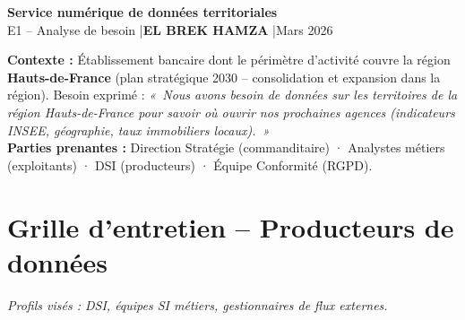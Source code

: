 \documentclass[11pt,a4paper]{article}
\begin{document}

\begin{center}
  {\large \textbf{Service numérique de données territoriales}}\\[0.2cm]
  {\normalsize E1 -- Analyse de besoin \quad|\quad \textbf{EL BREK HAMZA} \quad|\quad Mars 2026}
\end{center}

\vspace{0.2cm}
\begin{tcolorbox}[info]
\textbf{Contexte :} Établissement bancaire dont le périmètre d'activité couvre la région \textbf{Hauts-de-France} (plan stratégique 2030 -- consolidation et expansion dans la région). Besoin exprimé : \textit{«~Nous avons besoin de données sur les territoires de la région Hauts-de-France pour savoir où ouvrir nos prochaines agences (indicateurs INSEE, géographie, taux immobiliers locaux).~»}\\
\textbf{Parties prenantes :} Direction Stratégie (commanditaire) · Analystes métiers (exploitants) · DSI (producteurs) · Équipe Conformité (RGPD).
\end{tcolorbox}

\section{Grille d'entretien -- Producteurs de données}
{\small \textit{Profils visés : DSI, équipes SI métiers, gestionnaires de flux externes.}}
\end{document}
